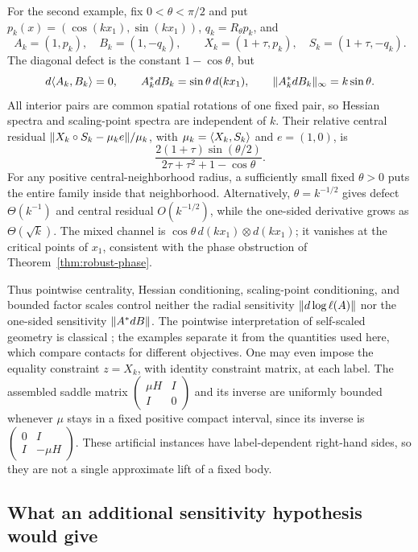 For the second example, fix $0<\theta<\pi/2$ and put
$p_k(x)=(\cos(kx_1),\sin(kx_1))$, $q_k=R_\theta p_k$, and
\begin{equation}\label{eq:conditioning-rotating}
 A_k=(1,p_k),\quad B_k=(1,-q_k),\qquad
 X_k=(1+\tau,p_k),\quad S_k=(1+\tau,-q_k).
\end{equation}
The diagonal defect is the constant $1-\cos\theta$, but
\[
 d\langle A_k,B_k\rangle=0,\qquad
 A_k^*dB_k=\sin\theta\,d(kx_1),\qquad
 \lVert A_k^*dB_k\rVert_\infty=k\sin\theta.
\]
All interior pairs are common spatial rotations of one fixed pair, so
Hessian spectra and scaling-point spectra are independent of $k$.
Their relative central residual
$\lVert X_k\circ S_k-\mu_ke\rVert/\mu_k$, with $\mu_k=\langle X_k,S_k\rangle$ and
$e=(1,0)$, is
\[
 \frac{2(1+\tau)\sin(\theta/2)}
 {2\tau+\tau^2+1-\cos\theta}.
\]
For any positive central-neighborhood radius, a sufficiently small
fixed $\theta>0$ puts the entire family inside that neighborhood.
Alternatively, $\theta=k^{-1/2}$ gives defect $\Theta(k^{-1})$ and
central residual $O(k^{-1/2})$, while the one-sided derivative grows as
$\Theta(\sqrt{k})$.  The mixed channel is
$\cos\theta\,d(kx_1)\otimes d(kx_1)$; it vanishes at the critical
points of $x_1$, consistent with the phase obstruction of
Theorem~\ref{thm:robust-phase}.

Thus pointwise centrality, Hessian conditioning, scaling-point
conditioning, and bounded factor scales control neither the radial
sensitivity $\lVert d\log\ell(A)\rVert$ nor the one-sided sensitivity
$\lVert A^*dB\rVert$.  The pointwise interpretation of self-scaled geometry is
classical \citep{NT1997}; the examples separate it from the quantities
used here, which compare contacts for different objectives.
One may even impose the equality constraint $z=X_k$, with identity
constraint matrix, at each label.  The
assembled saddle matrix $\left(\begin{smallmatrix}\mu H&I\\I&0
\end{smallmatrix}\right)$ and its inverse are uniformly bounded whenever
$\mu$ stays in a fixed positive compact interval, since its inverse is
$\left(\begin{smallmatrix}0&I\\I&-\mu H\end{smallmatrix}\right)$.
These artificial instances have label-dependent right-hand sides, so
they are not a single approximate lift of a fixed body.

\subsection{What an additional sensitivity hypothesis would give}

